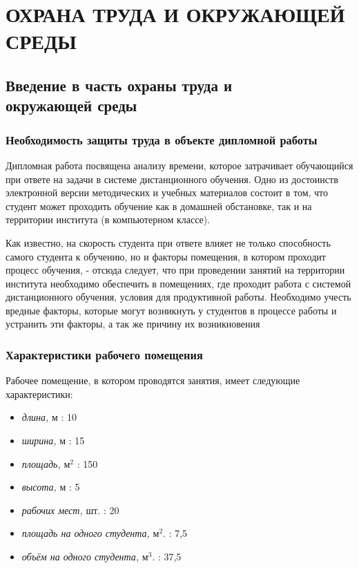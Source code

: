  \chapter{ОХРАНА ТРУДА И ОКРУЖАЮЩЕЙ СРЕДЫ}
\setcounter{page}{44}
\label{mainpart}  
\newpage
\section{Введение в часть охраны труда и\\ окружающей среды}

\subsection{Необходимость защиты труда в объекте дипломной работы}

Дипломная работа посвящена анализу времени, которое затрачивает обу\-чающийся при ответе на задачи в системе дистанционного обучения. Одно из достоинств электронной версии методических и учебных материалов состоит в том, что студент может проходить обучение как в домашней обстановке, так и на территории института (в компьютерном классе). 

Как известно, на скорость студента при ответе влияет не только способ\-ность самого студента к обучению, но и факторы помещения, в котором проходит процесс обучения, - отсюда следует, что при проведении занятий на территории института необходимо  обеспечить в помещениях, где проходит работа с системой дистанционного обучения, условия для продуктивной ра\-боты. Необходимо учесть вредные факторы, которые могут возникнуть у студентов в процессе работы и устранить эти факторы, а так же причину их возникновения

\subsection{Характеристики рабочего помещения}
\label{hro}

Рабочее помещение, в котором проводятся занятия, имеет следующие ха\-рактеристики:

\begin{itemize}
\item {\itshape длина,} м : 10
\item {\itshape ширина,} м : 15
\item {\itshape площадь,} м$^2$ : 150
\item {\itshape высота,} м : 5
\item {\itshape рабочих мест,} шт. : 20
\item {\itshape площадь на одного студента,} м$^2$. : 7,5
\item {\itshape объём на одного студента,} м$^3$. : 37,5
\end{itemize}

